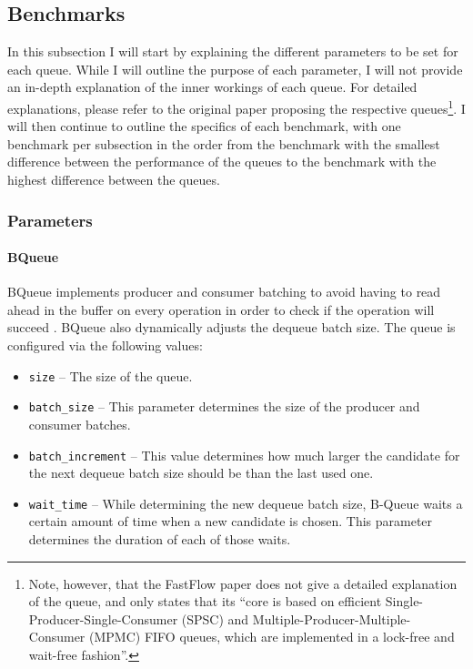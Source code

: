 \subsection{Benchmarks}
In this subsection I will start by explaining the different parameters to be set for each queue.
While I will outline the purpose of each parameter, I will not provide an in-depth explanation of the inner
workings of each queue.
For detailed explanations, please refer to the original paper proposing the respective queues\footnote{Note,
    however, that the FastFlow paper does not give a detailed explanation of the queue, and only states that its
    ``core is based on efficient Single-Producer-Single-Consumer (SPSC) and Multiple-Producer-Multiple-Consumer
(MPMC) FIFO queues, which are implemented in a lock-free and wait-free fashion''\cite{FastFlow}.}.
I will then continue to outline the specifics of each benchmark, with one benchmark per subsection in the
order from the benchmark with the smallest difference between the performance of the queues to the benchmark
with the highest difference between the queues.

\subsubsection{Parameters}
\paragraph{BQueue}
BQueue implements producer and consumer batching to avoid having to read ahead in the buffer on every
operation in order to check if the operation will succeed \cite{B-Queue}.
BQueue also dynamically adjusts the dequeue batch size.
The queue is configured via the following values:
\begin{itemize}
    \item \texttt{size} -- The size of the queue.
    \item \texttt{batch\_size} -- This parameter determines the size of the producer and consumer batches.
    \item \texttt{batch\_increment} -- This value determines how much larger the candidate for the next
        dequeue batch size should be than the last used one.
    \item \texttt{wait\_time} -- While determining the new dequeue batch size, B-Queue waits a certain amount
        of time when a new candidate is chosen. This parameter determines the duration of each of those waits.
\end{itemize}

